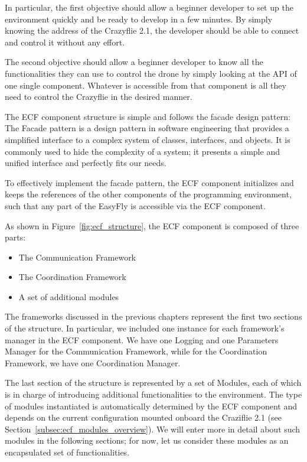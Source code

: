 In particular, the first objective should allow a beginner developer to set up the environment quickly and be ready to develop in a few minutes. 
By simply knowing the address of the Crazyflie 2.1, the developer should be able to connect and control it without any effort.

The second objective should allow a beginner developer to know all the functionalities they can use to control the drone by simply looking at the API of one single component. 
Whatever is accessible from that component is all they need to control the Crazyflie in the desired manner.

The ECF component structure is simple and follows the facade design pattern:
The Facade pattern is a design pattern in software engineering that provides a simplified interface to a complex system of classes, interfaces, and objects. 
It is commonly used to hide the complexity of a system; it presents a simple and unified interface and perfectly fits our needs.

To effectively implement the facade pattern, the ECF component initializes and keeps the references of the other components of the programming environment, 
such that any part of the EasyFly is accessible via the ECF component.

As shown in Figure~\ref{fig:ecf_structure}, the ECF component is composed of three parts:
\begin{itemize}
    \item The Communication Framework
    \item The Coordination Framework
    \item A set of additional modules
\end{itemize}

The frameworks discussed in the previous chapters represent the first two sections of the structure. 
In particular, we included one instance for each framework's manager in the ECF component.
We have one Logging and one Parameters Manager for the Communication Framework, while for the Coordination Framework, we have one Coordination Manager.

The last section of the structure is represented by a set of Modules, each of which is in charge of introducing additional functionalities to the environment. 
The type of modules instantiated is automatically determined by the ECF component and depends on the current configuration mounted onboard the Craziflie 2.1 (see Section~\ref{subsec:ecf_modules_overview}).
We will enter more in detail about such modules in the following sections; for now, let us consider these modules as an encapsulated set of functionalities.
 
